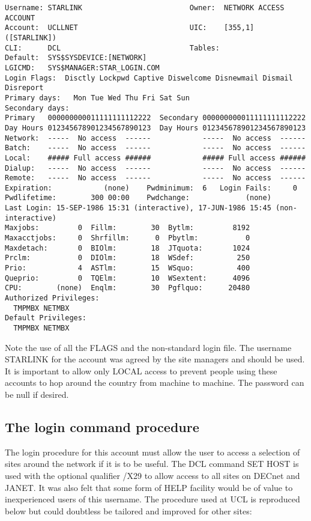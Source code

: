 \begin{verbatim}
Username: STARLINK                         Owner:  NETWORK ACCESS ACCOUNT
Account:  UCLLNET                          UIC:    [355,1] ([STARLINK])
CLI:      DCL                              Tables: 
Default:  SYS$SYSDEVICE:[NETWORK]
LGICMD:   SYS$MANAGER:STAR_LOGIN.COM
Login Flags:  Disctly Lockpwd Captive Diswelcome Disnewmail Dismail Disreport
Primary days:   Mon Tue Wed Thu Fri Sat Sun
Secondary days:                            
Primary   000000000011111111112222  Secondary 000000000011111111112222
Day Hours 012345678901234567890123  Day Hours 012345678901234567890123
Network:  -----  No access  ------            -----  No access  ------
Batch:    -----  No access  ------            -----  No access  ------
Local:    ##### Full access ######            ##### Full access ######
Dialup:   -----  No access  ------            -----  No access  ------
Remote:   -----  No access  ------            -----  No access  ------
Expiration:            (none)    Pwdminimum:  6   Login Fails:     0
Pwdlifetime:        300 00:00    Pwdchange:             (none) 
Last Login: 15-SEP-1986 15:31 (interactive), 17-JUN-1986 15:45 (non-interactive)
Maxjobs:         0  Fillm:        30  Bytlm:         8192
Maxacctjobs:     0  Shrfillm:      0  Pbytlm:           0
Maxdetach:       0  BIOlm:        18  JTquota:       1024
Prclm:           0  DIOlm:        18  WSdef:          250
Prio:            4  ASTlm:        15  WSquo:          400
Queprio:         0  TQElm:        10  WSextent:      4096
CPU:        (none)  Enqlm:        30  Pgflquo:      20480
Authorized Privileges: 
  TMPMBX NETMBX
Default Privileges: 
  TMPMBX NETMBX
\end{verbatim}

\large

Note the use of all the FLAGS and the non-standard login file.
The username STARLINK for the account was agreed by the site managers and
should be used.
It is important to allow only LOCAL access to prevent people using these
accounts to hop around the country from machine to machine.
The password can be null if desired.

\subsection {The login command procedure}

The login procedure for this account must allow the user to access a selection
of sites around the network if it is to be useful.
The DCL command SET HOST is used with the optional qualifier /X29 to allow
access to all sites on DECnet and JANET.
It was also felt that some form of HELP facility would be of value to
inexperienced users of this username.
The procedure used at UCL is reproduced below but could doubtless be tailored
and improved for other sites:

